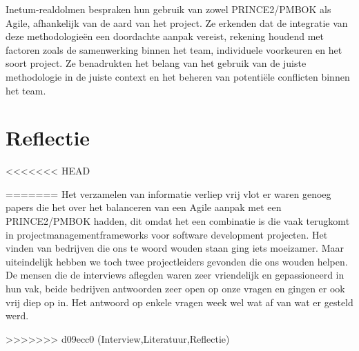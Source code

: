 \documentclass[dutch]{hogent-article}
\begin{document}
Inetum-realdolmen bespraken hun gebruik van zowel PRINCE2/PMBOK als Agile, afhankelijk van de aard van het project. Ze erkenden dat de integratie van deze methodologieën een doordachte aanpak vereist, rekening houdend met factoren zoals de samenwerking binnen het team, individuele voorkeuren en het soort project. Ze benadrukten het belang van het gebruik van de juiste methodologie in de juiste context en het beheren van potentiële conflicten binnen het team.
\newline



\section{Reflectie}
\label{sec:reflectie}
<<<<<<< HEAD

\printbibliography[heading=bibintoc]
=======
Het verzamelen van informatie verliep vrij vlot er waren genoeg papers die het over het balanceren van
een Agile aanpak met een PRINCE2/PMBOK hadden, dit omdat het een combinatie is die vaak terugkomt in
projectmanagementframeworks voor software development projecten. Het vinden van bedrijven die ons te woord wouden staan ging iets moeizamer.
Maar uiteindelijk hebben we toch twee projectleiders gevonden die ons wouden helpen. De mensen die de
interviews aflegden waren zeer vriendelijk en gepassioneerd in hun vak, beide bedrijven antwoorden zeer open op onze vragen en gingen er ook vrij diep op in.
Het antwoord op enkele vragen week wel wat af van wat er gesteld werd.

>>>>>>> d09ecc0 (Interview,Literatuur,Reflectie)
\end{document}
